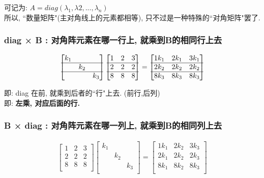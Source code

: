 \documentclass[UTF8]{ctexart}
\begin{document}
可记为: $A = diag(\lambda_1, \lambda2, ..., \lambda_n) $\\

所以, ``数量矩阵"(主对角线上的元素都相等), 只不过是一种特殊的``对角矩阵"罢了.\\




\subsubsection{diag × B : 对角阵元素在哪一行上, 就乘到B的相同行上去}

\begin{align}
	\left[ \begin{matrix}
		k_1&		&		\\
		\hline
		&		k_2&		\\
		\hline
		&		&		k_3\\
	\end{matrix} \right] \left[ \begin{matrix}
		1&		2&		3\\
		\hline
		2&		2&		2\\
		\hline
		8&		8&		8\\
	\end{matrix} \right] =\left[ \begin{matrix}
		1k_1&		2k_1&		3k_1\\
		\hline
		2k_2&		2k_2&		2k_2\\
		\hline
		8k_3&		8k_3&		8k_3\\
	\end{matrix} \right]
\end{align}

即: diag 在前, 就乘到后者的``行"上去. (前行,后列) \\
即: \textbf{左乘, 对应后面的行.}\\




\subsubsection{B × diag : 对角阵元素在哪一列上, 就乘到B的相同列上去}

\begin{align}
	\left[ \begin{array}{c|c|c}
		1&		2&		3\\
		2&		2&		2\\
		8&		8&		8\\
	\end{array} \right] \left[ \begin{array}{c|c|c}
		k_1&		&		\\
		&		k_2&		\\
		&		&		k_3\\
	\end{array} \right] =\left[ \begin{array}{c|c|c}
		1k_1&		2k_2&		3k_3\\
		2k_1&		2k_2&		2k_3\\
		8k_1&		8k_2&		8k_3\\
	\end{array} \right]
\end{align}
\end{document}

